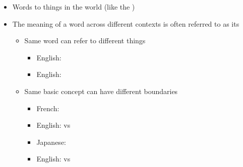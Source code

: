 \documentclass[headrule,footrule]{foils}
\begin{document}

\begin{itemize}
\item Words  to things in the world (like the  )
\item The meaning of a word across different contexts is often referred to as its 
  \begin{itemize}
  \item Same word can refer to different things
    \begin{itemize}
    \item English: 
    \item English: 
    \end{itemize}
  \item Same basic concept can have different boundaries
    \begin{itemize}
    \item French: 
    \item English:  vs 
      
    \item Japanese: 
    \item English:  vs 
    \end{itemize}
  \end{itemize}
\end{itemize}

\end{document}
